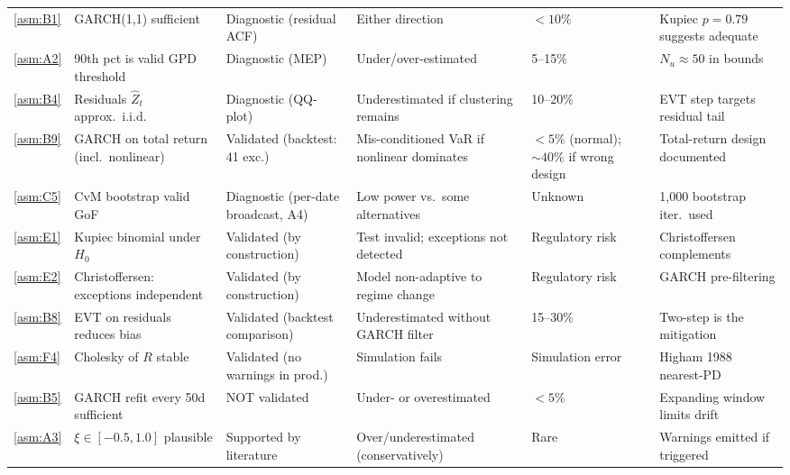 \documentclass[11pt,a4paper]{article}
\begin{document}
\begin{footnotesize}
\begin{longtable}{@{}p{0.65cm} p{4.0cm} p{2.6cm} p{3.4cm} p{2.0cm} p{2.8cm}@{}}
\cref{asm:B1}  & GARCH(1,1) sufficient & Diagnostic (residual ACF) & Either direction & $<10\%$ & Kupiec $p=0.79$ suggests adequate \\[4pt]

\cref{asm:A2}  & 90th pct is valid GPD threshold & Diagnostic (MEP) & Under/over-estimated & 5--15\% & $N_u\approx 50$ in bounds \\[4pt]

\cref{asm:B4}  & Residuals $\hat{Z}_t$ approx.\ i.i.d. & Diagnostic (QQ-plot) & Underestimated if clustering remains & 10--20\% & EVT step targets residual tail \\[4pt]

\cref{asm:B9}  & GARCH on total return (incl.\ nonlinear) & Validated (backtest: 41 exc.) & Mis-conditioned VaR if nonlinear dominates & $<5\%$ (normal); $\sim40\%$ if wrong design & Total-return design documented \\[4pt]

\cref{asm:C5}  & CvM bootstrap valid GoF & Diagnostic (per-date broadcast, A4) & Low power vs.\ some alternatives & Unknown & 1{,}000 bootstrap iter.\ used \\[4pt]

\cref{asm:E1}  & Kupiec binomial under $H_0$ & Validated (by construction) & Test invalid; exceptions not detected & Regulatory risk & Christoffersen complements \\[4pt]

\cref{asm:E2}  & Christoffersen: exceptions independent & Validated (by construction) & Model non-adaptive to regime change & Regulatory risk & GARCH pre-filtering \\[4pt]

\cref{asm:B8}  & EVT on residuals reduces bias & Validated (backtest comparison) & Underestimated without GARCH filter & 15--30\% & Two-step is the mitigation \\[4pt]

\cref{asm:F4}  & Cholesky of $R$ stable & Validated (no warnings in prod.) & Simulation fails & Simulation error & Higham 1988 nearest-PD \\[4pt]

\cref{asm:B5}  & GARCH refit every 50d sufficient & NOT validated & Under- or overestimated & $<5\%$ & Expanding window limits drift \\[4pt]

\cref{asm:A3}  & $\xi\in[-0.5,1.0]$ plausible & Supported by literature & Over/underestimated (conservatively) & Rare & Warnings emitted if triggered \\[4pt]


\end{longtable}
\end{footnotesize}
\end{document}
